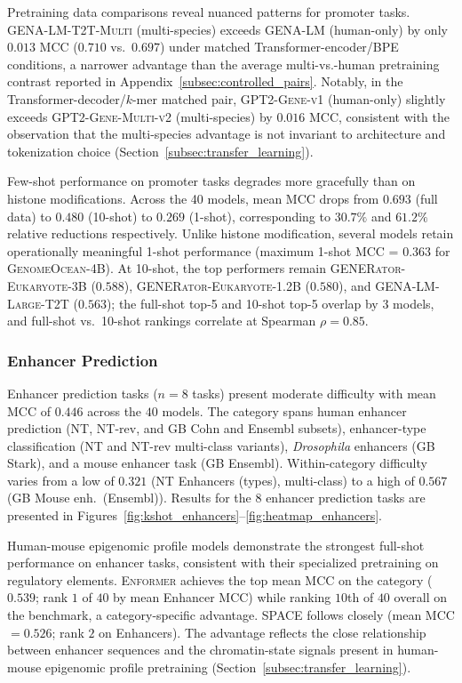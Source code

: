\documentclass{article}
\theoremstyle{plain}
\theoremstyle{definition}
\theoremstyle{remark}
\begin{document}
Pretraining data comparisons reveal nuanced patterns for promoter
tasks. \textsc{GENA-LM-T2T-Multi} (multi-species) exceeds
\textsc{GENA-LM} (human-only) by only $0.013$ MCC ($0.710$
vs.\ $0.697$) under matched Transformer-encoder/BPE conditions, a
narrower advantage than the average multi-vs.-human pretraining
contrast reported in
Appendix~\ref{subsec:controlled_pairs}. Notably, in the
Transformer-decoder/$k$-mer matched pair,
\textsc{GPT2-Gene-v1} (human-only) slightly exceeds
\textsc{GPT2-Gene-Multi-v2} (multi-species) by $0.016$ MCC,
consistent with the observation that the multi-species advantage
is not invariant to architecture and tokenization choice
(Section~\ref{subsec:transfer_learning}).

Few-shot performance on promoter tasks degrades more gracefully
than on histone modifications. Across the 40 models, mean MCC
drops from $0.693$ (full data) to $0.480$ (10-shot) to $0.269$
(1-shot), corresponding to $30.7\%$ and $61.2\%$ relative
reductions respectively. Unlike histone modification, several
models retain operationally meaningful 1-shot performance (maximum
1-shot MCC = $0.363$ for \textsc{GenomeOcean-4B}). At 10-shot, the
top performers remain \textsc{GENERator-Eukaryote-3B} ($0.588$),
\textsc{GENERator-Eukaryote-1.2B} ($0.580$), and
\textsc{GENA-LM-Large-T2T} ($0.563$); the full-shot top-5 and
10-shot top-5 overlap by 3 models, and full-shot vs.\ 10-shot
rankings correlate at Spearman $\rho = 0.85$.

\subsubsection{Enhancer Prediction}

Enhancer prediction tasks ($n=8$ tasks) present moderate difficulty
with mean MCC of $0.446$ across the $40$ models. The category
spans human enhancer prediction (NT, NT-rev, and GB Cohn and
Ensembl subsets), enhancer-type classification (NT and NT-rev
multi-class variants), \textit{Drosophila} enhancers (GB Stark),
and a mouse enhancer task (GB Ensembl). Within-category
difficulty varies from a low of $0.321$ (NT Enhancers (types),
multi-class) to a high of $0.567$ (GB Mouse enh.\ (Ensembl)).
Results for the 8 enhancer prediction tasks are presented in
Figures~\ref{fig:kshot_enhancers}--\ref{fig:heatmap_enhancers}.

Human-mouse epigenomic profile models demonstrate the strongest
full-shot performance on enhancer tasks, consistent with their
specialized pretraining on regulatory elements.
\textsc{Enformer} achieves the top mean MCC on the category
($0.539$; rank $1$ of $40$ by mean Enhancer MCC) while ranking
$10$th of $40$ overall on the benchmark, a category-specific
advantage. \textsc{SPACE} follows closely (mean MCC $= 0.526$;
rank $2$ on Enhancers). The advantage reflects the close
relationship between enhancer sequences and the chromatin-state
signals present in human-mouse epigenomic profile pretraining
(Section~\ref{subsec:transfer_learning}).
\end{document}
